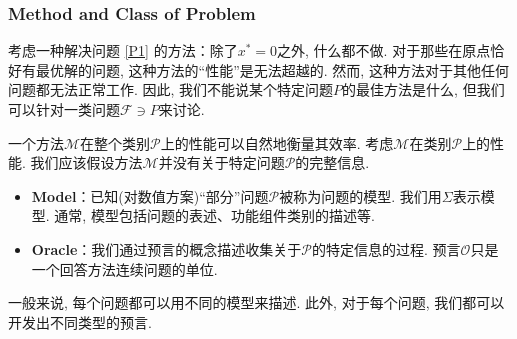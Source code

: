\subsubsection{Method and Class of Problem}




考虑一种解决问题 \ref{P1} 的方法：除了$x^*=0$之外, 什么都不做. 对于那些在原点恰好有最优解的问题, 这种方法的``性能''是无法超越的. 然而, 这种方法对于其他任何问题都无法正常工作. 因此, 我们不能说某个特定问题$P$的最佳方法是什么, 但我们可以针对一类问题$\mathcal{F} \ni P$来讨论. 

一个方法$\mathcal{M}$在整个类别$\mathcal{P}$上的性能可以自然地衡量其效率. 考虑$\mathcal{M}$在类别$\mathcal{P}$上的性能. 我们应该假设方法$\mathcal{M}$并没有关于特定问题$\mathcal{P}$的完整信息. 

\begin{itemize}
    \item \textbf{Model}：已知(对数值方案)``部分''问题$\mathcal{P}$被称为问题的模型. 我们用$\Sigma$表示模型. 通常, 模型包括问题的表述、功能组件类别的描述等. 
    \item \textbf{Oracle}：我们通过预言的概念描述收集关于$\mathcal{P}$的特定信息的过程. 预言$\mathcal{O}$只是一个回答方法连续问题的单位. 
\end{itemize}
一般来说, 每个问题都可以用不同的模型来描述. 此外, 对于每个问题, 我们都可以开发出不同类型的预言. 

